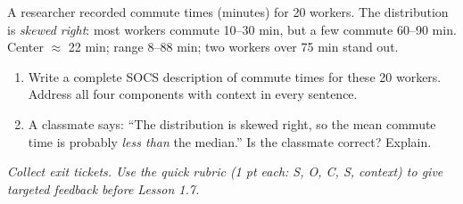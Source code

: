 \documentclass[aspectratio=169, 11pt]{beamer}
\begin{document}
{
\begin{frame}[t, plain]
  \vspace{1em}%
  \hspace{0.55cm}%
  \begin{minipage}{0.9\textwidth}
    \small

    A researcher recorded commute times (minutes) for 20 workers.
    The distribution is \textit{skewed right}: most workers commute 10--30 min,
    but a few commute 60--90 min. Center $\approx$ 22 min;
    range 8--88 min; two workers over 75 min stand out.

    \vspace{0.6em}
    \begin{enumerate}
      \setlength{\itemsep}{0.7em}
      \item Write a complete SOCS description of commute times for these
            20 workers. Address all four components with context in every sentence.
      \item A classmate says: ``The distribution is skewed right, so the mean
            commute time is probably \textit{less than} the median.''
            Is the classmate correct? Explain.
    \end{enumerate}

    \vspace{0.5cm}
    {\color{navy}\itshape\small
      Collect exit tickets. Use the quick rubric (1 pt each: S, O, C, S, context)
      to give targeted feedback before Lesson 1.7.}
  \end{minipage}
\end{frame}
}
\end{document}
